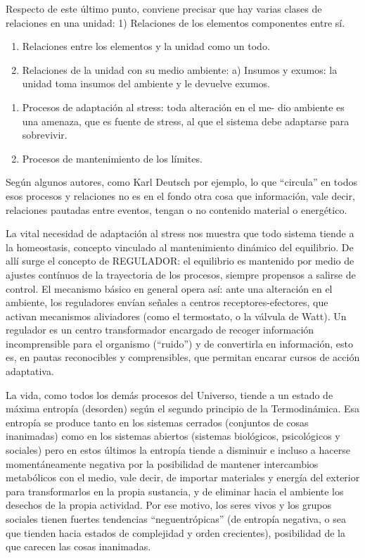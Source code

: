 \documentclass[
]{book}
\begin{document}
Respecto de este último punto, conviene precisar que hay varias clases de relaciones en una unidad: 1) Relaciones de los elementos componentes entre sí.

\begin{enumerate}
\def\labelenumi{\arabic{enumi})}
\setcounter{enumi}{1}
\item
  Relaciones entre los elementos y la unidad como un todo.
\item
  Relaciones de la unidad con su medio ambiente: a) Insumos y exumos: la unidad toma insumos del ambiente y le devuelve exumos.
\end{enumerate}

\begin{enumerate}
\def\labelenumi{\alph{enumi})}
\setcounter{enumi}{1}
\item
  Procesos de adaptación al stress: toda alteración en el me- dio ambiente es una amenaza, que es fuente de stress, al que el sistema debe adaptarse para sobrevivir.
\item
  Procesos de mantenimiento de los límites.
\end{enumerate}

Según algunos autores, como Karl Deutsch por ejemplo, lo que ``circula'' en todos esos procesos y relaciones no es en el fondo otra cosa que información, vale decir, relaciones pautadas entre eventos, tengan o no contenido material o energético.

La vital necesidad de adaptación al stress nos muestra que todo sistema tiende a la homeostasis, concepto vinculado al mantenimiento dinámico del equilibrio. De allí surge el concepto de REGULADOR: el equilibrio es mantenido por medio de ajustes contínuos de la trayectoria de los procesos, siempre propensos a salirse de control. El mecanismo básico en general opera así: ante una alteración en el ambiente, los reguladores envían señales a centros receptores-efectores, que activan mecanismos aliviadores (como el termostato, o la válvula de Watt). Un regulador es un centro transformador encargado de recoger información incomprensible para el organismo (``ruido'') y de convertirla en información, esto es, en pautas reconocibles y comprensibles, que permitan encarar cursos de acción adaptativa.

La vida, como todos los demás procesos del Universo, tiende a un estado de máxima entropía (desorden) según el segundo principio de la Termodinámica. Esa entropía se produce tanto en los sistemas cerrados (conjuntos de cosas inanimadas) como en los sistemas abiertos (sistemas biológicos, psicológicos y sociales) pero en estos últimos la entropía tiende a disminuir e incluso a hacerse momentáneamente negativa por la posibilidad de mantener intercambios metabólicos con el medio, vale decir, de importar materiales y energía del exterior para transformarlos en la propia sustancia, y de eliminar hacia el ambiente los desechos de la propia actividad. Por ese motivo, los seres vivos y los grupos sociales tienen fuertes tendencias ``neguentrópicas'' (de entropía negativa, o sea que tienden hacia estados de complejidad y orden crecientes), posibilidad de la que carecen las cosas inanimadas.
\end{document}
